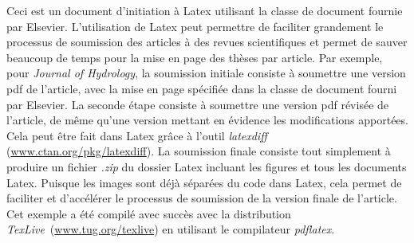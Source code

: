 \documentclass[../exemple_master.tex]{subfiles}
\begin{document}
Ceci est un document d'initiation à Latex utilisant la classe de document fournie par Elsevier. L'utilisation de Latex peut permettre de faciliter grandement le processus de soumission des articles à des revues scientifiques et permet de sauver beaucoup de temps pour la mise en page des thèses par article. Par exemple, pour \emph{Journal of Hydrology}, la soumission initiale consiste à soumettre une version pdf de l'article, avec la mise en page spécifiée dans la classe de document fourni par Elsevier. La seconde étape consiste à soumettre une version pdf révisée de l'article, de même qu'une version mettant en évidence les modifications apportées. Cela peut être fait dans Latex grâce à l'outil \emph{latexdiff} (\url{www.ctan.org/pkg/latexdiff}). La soumission finale consiste tout simplement à produire un fichier \emph{.zip} du dossier Latex incluant les figures et tous les documents Latex. Puisque les images sont déjà séparées du code dans Latex, cela permet de faciliter et d'accélérer le processus de soumission de la version finale de l'article. Cet exemple a été compilé avec succès avec la distribution \emph{TexLive}~(\url{www.tug.org/texlive}) en utilisant le compilateur \emph{pdflatex}.
\end{document}
